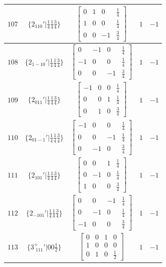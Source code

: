 \documentclass[fleqn,8pt]{jsarticle}
\begin{document}
\begin{longtable}{ccccc}
$ 107 $ & $ \{2{}_{110}{}'|\frac{1}{4} \frac{1}{4} \frac{3}{4}\} $ & $ \begin{bmatrix} 0 & 1 & 0 & \frac{1}{4} \\ 1 & 0 & 0 & \frac{1}{4} \\ 0 & 0 & -1 & \frac{3}{4} \end{bmatrix} $ & $ 1 $ & $ -1 $ \\ \hline
$ 108 $ & $ \{2{}_{1-10}{}'|\frac{1}{4} \frac{1}{4} \frac{3}{4}\} $ & $ \begin{bmatrix} 0 & -1 & 0 & \frac{1}{4} \\ -1 & 0 & 0 & \frac{1}{4} \\ 0 & 0 & -1 & \frac{3}{4} \end{bmatrix} $ & $ 1 $ & $ -1 $ \\ \hline
$ 109 $ & $ \{2{}_{011}{}'|\frac{1}{4} \frac{1}{4} \frac{3}{4}\} $ & $ \begin{bmatrix} -1 & 0 & 0 & \frac{1}{4} \\ 0 & 0 & 1 & \frac{1}{4} \\ 0 & 1 & 0 & \frac{3}{4} \end{bmatrix} $ & $ 1 $ & $ -1 $ \\ \hline
$ 110 $ & $ \{2{}_{01-1}{}'|\frac{1}{4} \frac{1}{4} \frac{3}{4}\} $ & $ \begin{bmatrix} -1 & 0 & 0 & \frac{1}{4} \\ 0 & 0 & -1 & \frac{1}{4} \\ 0 & -1 & 0 & \frac{3}{4} \end{bmatrix} $ & $ 1 $ & $ -1 $ \\ \hline
$ 111 $ & $ \{2{}_{101}{}'|\frac{1}{4} \frac{1}{4} \frac{3}{4}\} $ & $ \begin{bmatrix} 0 & 0 & 1 & \frac{1}{4} \\ 0 & -1 & 0 & \frac{1}{4} \\ 1 & 0 & 0 & \frac{3}{4} \end{bmatrix} $ & $ 1 $ & $ -1 $ \\ \hline
$ 112 $ & $ \{2{}_{-101}{}'|\frac{1}{4} \frac{1}{4} \frac{3}{4}\} $ & $ \begin{bmatrix} 0 & 0 & -1 & \frac{1}{4} \\ 0 & -1 & 0 & \frac{1}{4} \\ -1 & 0 & 0 & \frac{3}{4} \end{bmatrix} $ & $ 1 $ & $ -1 $ \\ \hline
$ 113 $ & $ \{3^{+}_{\,\,111}{}'|0 0 \frac{1}{2}\} $ & $ \begin{bmatrix} 0 & 0 & 1 & 0 \\ 1 & 0 & 0 & 0 \\ 0 & 1 & 0 & \frac{1}{2} \end{bmatrix} $ & $ 1 $ & $ -1 $ \\ \hline

\end{longtable}
\end{document}
